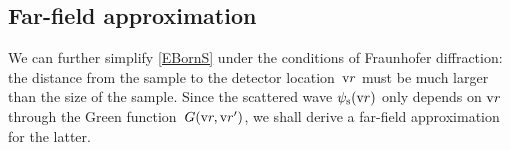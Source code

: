 %

\subsection{Far-field approximation}

%

We can further simplify \cref{EBornS}
under the conditions of Fraunhofer diffraction:
%
the distance from the sample to the detector location~$\text{v}{r}$
must be much larger than the size of the sample.
Since the scattered wave $\psi_\text{s}(\text{v}{r})$
only depends on $\text{v}{r}$ through the Green function~$G(\text{v}{r},\text{v}{r}')$,
we shall derive a far-field approximation for the latter.

